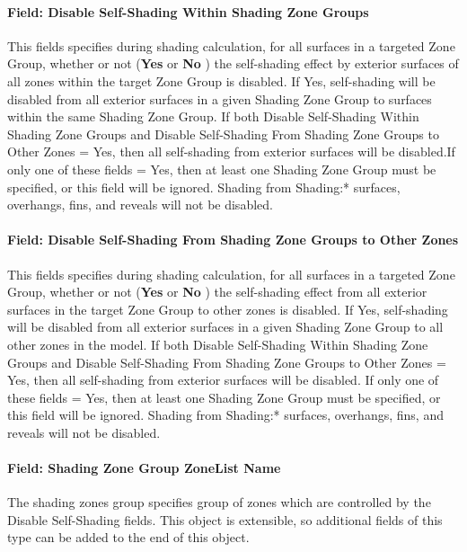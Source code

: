 \paragraph{Field: Disable Self-Shading Within Shading Zone Groups}\label{fieldself--disable-shading-within-a-zone-group}
This fields specifies during shading calculation, for all surfaces in a targeted Zone Group, whether or not (\textbf{Yes} or \textbf{No} ) the self-shading effect by exterior surfaces of all zones within the target Zone Group is disabled. If Yes, self-shading will be disabled from all exterior surfaces in a given Shading Zone Group to surfaces within the same Shading Zone Group. If both Disable Self-Shading Within Shading Zone Groups and Disable Self-Shading From Shading Zone Groups to Other Zones = Yes, then all self-shading from exterior surfaces will be disabled.If only one of these fields = Yes, then at least one Shading Zone Group must be specified, or this field will be ignored. Shading from Shading:* surfaces, overhangs, fins, and reveals will not be disabled.

\paragraph{Field: Disable Self-Shading From Shading Zone Groups to Other Zones}\label{field-self-disable-shading-between-zone-groups}
This fields specifies during shading calculation, for all surfaces in a targeted Zone Group, whether or not (\textbf{Yes} or \textbf{No} ) the self-shading effect from all exterior surfaces in the target Zone Group to other zones is disabled. If Yes, self-shading will be disabled from all exterior surfaces in a given Shading Zone Group to all other zones in the model. If both Disable Self-Shading Within Shading Zone Groups and Disable Self-Shading From Shading Zone Groups to Other Zones = Yes, then all self-shading from exterior surfaces will be disabled. If only one of these fields = Yes, then at least one Shading Zone Group must be specified, or this field will be ignored. Shading from Shading:* surfaces, overhangs, fins, and reveals will not be disabled.

\paragraph{Field: Shading Zone Group ZoneList Name}\label{field-shading-zone-group-zoneList-name}
The shading zones group specifies group of zones which are controlled by the Disable Self-Shading fields.  This object is extensible, so additional fields of this type can be added to the end of this object.

